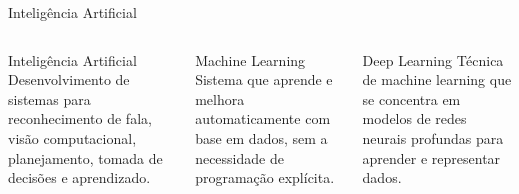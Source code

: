 \begin{frame}{Inteligência Artificial}
\begin{columns}[t]
%
\begin{block}{Inteligência Artificial}
    Desenvolvimento de sistemas para reconhecimento de fala, visão computacional, planejamento, tomada de decisões e aprendizado.
\end{block}
%
\begin{block}{Machine Learning}
    Sistema que aprende e melhora automaticamente com base em dados, sem a necessidade de programação explícita. 
\end{block}
%
\begin{block}{Deep Learning}
    Técnica de machine learning que se concentra em modelos de \alert{redes neurais} profundas para aprender e representar dados.
\end{block}
\end{columns}
\end{frame}
